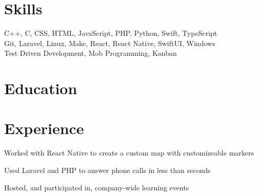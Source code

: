 \documentclass[]{deedy-resume-openfont}
\begin{document}
\hfill
\begin{minipage}[t]{0.95\textwidth}


\section{Skills}
C++, C, CSS, HTML, JavaScript, PHP, Python, Swift, TypeScript\\
Git, Laravel, Linux, Make, React, React Native, SwiftUI, Windows\\
Test Driven Development, Mob Programming, Kanban


\section{Education} 






\section{Experience}



\vspace{\topsep} %
\begin{tightemize}
\item Worked with React Native to create a custom map with customizeable markers
\item Used Laravel and PHP to answer phone calls in less than seconds
\item Hosted, and participated in, company-wide learning events
\end{tightemize}


\end{minipage}
\end{document}
